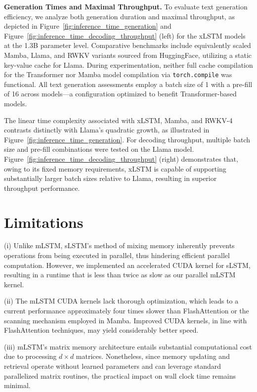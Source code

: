\textbf{Generation Times and Maximal Throughput.} To evaluate text generation efficiency, we analyze both generation duration and maximal throughput, as depicted in Figure~\ref{fig:inference_time_generation} and Figure~\ref{fig:inference_time_decoding_throughput} (left) for the xLSTM models at the 1.3B parameter level. Comparative benchmarks include equivalently scaled Mamba, Llama, and RWKV variants sourced from HuggingFace, utilizing a static key-value cache for Llama. During experimentation, neither full cache compilation for the Transformer nor Mamba model compilation via \texttt{torch.compile} was functional. All text generation assessments employ a batch size of 1 with a pre-fill of 16 across models—a configuration optimized to benefit Transformer-based models.

The linear time complexity associated with xLSTM, Mamba, and RWKV-4 contrasts distinctly with Llama’s quadratic growth, as illustrated in Figure~\ref{fig:inference_time_generation}. For decoding throughput, multiple batch size and pre-fill combinations were tested on the Llama model. Figure~\ref{fig:inference_time_decoding_throughput} (right) demonstrates that, owing to its fixed memory requirements, xLSTM is capable of supporting substantially larger batch sizes relative to Llama, resulting in superior throughput performance.

\section{Limitations}

(i) Unlike mLSTM, sLSTM’s method of mixing memory inherently prevents operations from being executed in parallel, thus hindering efficient parallel computation. However, we implemented an accelerated CUDA kernel for sLSTM, resulting in a runtime that is less than twice as slow as our parallel mLSTM kernel.

(ii) The mLSTM CUDA kernels lack thorough optimization, which leads to a current performance approximately four times slower than FlashAttention or the scanning mechanism employed in Mamba. Improved CUDA kernels, in line with FlashAttention techniques, may yield considerably better speed.

(iii) mLSTM’s matrix memory architecture entails substantial computational cost due to processing $d \times d$ matrices. Nonetheless, since memory updating and retrieval operate without learned parameters and can leverage standard parallelized matrix routines, the practical impact on wall clock time remains minimal.

